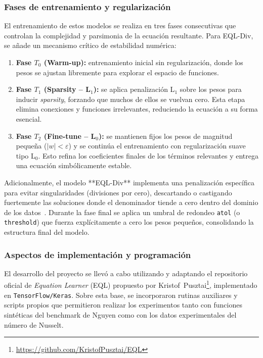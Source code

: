 \subsubsection{Fases de entrenamiento y regularización}

El entrenamiento de estos modelos se realiza en tres fases consecutivas que controlan la complejidad y parsimonia de la ecuación resultante. Para EQL-Div, se añade un mecanismo crítico de estabilidad numérica:

\begin{enumerate}
    \item \textbf{Fase $T_0$ (Warm-up):} entrenamiento inicial sin regularización, donde los pesos se ajustan libremente para explorar el espacio de funciones.
    \item \textbf{Fase $T_1$ (Sparsity – L$_1$):} se aplica penalización L$_1$ sobre los pesos para inducir \textit{sparsity}, forzando que muchos de ellos se vuelvan cero. 
    Esta etapa elimina conexiones y funciones irrelevantes, reduciendo la ecuación a su forma esencial.
    \item \textbf{Fase $T_2$ (Fine-tune – L$_0$):} se mantienen fijos los pesos de magnitud pequeña ($|w|<\varepsilon$) y se continúa el entrenamiento con regularización suave tipo L$_0$. 
    Esto refina los coeficientes finales de los términos relevantes y entrega una ecuación simbólicamente estable.
\end{enumerate}

Adicionalmente, el modelo **EQL-Div** implementa una penalización específica para evitar singularidades (divisiones por cero), descartando o castigando fuertemente las soluciones donde el denominador tiende a cero dentro del dominio de los datos~\cite{2}.
Durante la fase final se aplica un umbral de redondeo \texttt{atol} (o \texttt{threshold}) que fuerza explícitamente a cero los pesos pequeños, consolidando la estructura final del modelo.


\subsubsection{Aspectos de implementación y programación}

El desarrollo del proyecto se llevó a cabo utilizando y adaptando el repositorio oficial de \textit{Equation Learner} (EQL) propuesto por Kristof~Pusztai\footnote{\url{https://github.com/KristofPusztai/EQL}}, implementado en \texttt{TensorFlow/Keras}. 
Sobre esta base, se incorporaron rutinas auxiliares y scripts propios que permitieron realizar los experimentos tanto con funciones sintéticas del benchmark de Nguyen como con los datos experimentales del número de Nusselt.\\ 

